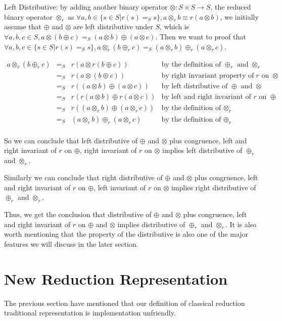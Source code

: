 \documentclass[a4paper,10pt]{article}
\newcommand{\e}[2]{
\begin{equation}
  \label{#1} 
  #2
\end{equation}
}
\begin{document}
Left Distributive: by adding another binary operator $\otimes : S \times S \rightarrow S$, the reduced binary operator $\otimes_r$ as $\forall a,b \in \{s \in S | r(s) =_S s\}, a \otimes_r b \equiv r(a \otimes b)$, we initially assume that $\oplus$ and $\otimes$ are left distributive under $S$, which is $\forall a,b,c \in S, a \otimes (b \oplus c) =_S (a \otimes b) \oplus (a \otimes c)$. Then we want to proof that $\forall a,b,c \in \{s \in S | r(s) =_S s\}, a \otimes_r (b \oplus_r c) =_S (a \otimes_r b) \oplus_r (a \otimes_r c)$. 
\e{r:proof:left_distributive}{
\begin{array}{rcll} 
a \otimes_r (b \oplus_r c) & =_S & r(a \otimes r(b \oplus c)) &\mbox{by the definition of $\oplus_r$ and $\otimes_r$} \\
			 & =_S & r(a \otimes (b \oplus c)) &\mbox{by right invariant property of $r$ on $\otimes$}\\
			 & =_S & r((a \otimes b) \oplus (a \otimes c)) &\mbox{by left distributive of $\oplus$ and $\otimes$}\\
			 & =_S & r(r(a \otimes b) \oplus r(a \otimes c)) &\mbox{by left and right invariant of $r$ on $\oplus$}\\			 
			 & =_S & r((a \otimes_r b) \oplus (a \otimes_r c)) &\mbox{by the definition of $\otimes_r$}\\
             & =_S & (a \otimes_r b) \oplus_r (a \otimes_r c)  &\mbox{by the definition of $\oplus_r$} \\
\end{array}}
So we can conclude that left distributive of $\oplus$ and $\otimes$ plus congruence, left and right invariant of $r$ on $\oplus$, right invariant of $r$ on $\otimes$ implies left distributive of $\oplus_r$ and $\otimes_r$.

Similarly we can conclude that right distributive of $\oplus$ and $\otimes$ plus congruence, left and right invariant of $r$ on $\oplus$, left invariant of $r$ on $\otimes$ implies right distributive of $\oplus_r$ and $\otimes_r$.

Thus, we get the conclusion that distributive of $\oplus$ and $\otimes$ plus congruence, left and right invariant of $r$ on $\oplus$ and $\otimes$ implies distributive of $\oplus_r$ and $\otimes_r$.
It is also worth mentioning that the property of the distributive is also one of the major features we will discuss in the later section.

\section{New Reduction Representation}
The previous section have mentioned that our definition of classical reduction traditional representation is implementation unfriendly.
\end{document}
